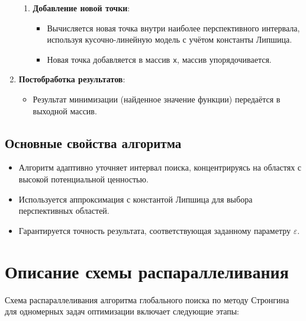 \documentclass[a4paper,12pt]{article}
\begin{document}
\begin{enumerate}
\begin{enumerate}
        \item \textbf{Добавление новой точки}:
        \begin{itemize}
            \item Вычисляется новая точка внутри наиболее перспективного интервала, используя кусочно-линейную модель с учётом константы Липшица.
            \item Новая точка добавляется в массив \texttt{x}, массив упорядочивается.
        \end{itemize}
    \end{enumerate}

    \item \textbf{Постобработка результатов}:
    \begin{itemize}
        \item Результат минимизации (найденное значение функции) передаётся в выходной массив.
    \end{itemize}
\end{enumerate}

\subsection{Основные свойства алгоритма}
\begin{itemize}
    \item Алгоритм адаптивно уточняет интервал поиска, концентрируясь на областях с высокой потенциальной ценностью.
    \item Используется аппроксимация с константой Липшица для выбора перспективных областей.
    \item Гарантируется точность результата, соответствующая заданному параметру $\varepsilon$.
\end{itemize}


\section{Описание схемы распараллеливания}

\hspace*{1.25em}Схема распараллеливания алгоритма глобального поиска по методу Стронгина для одномерных задач оптимизации включает следующие этапы:
\end{document}
